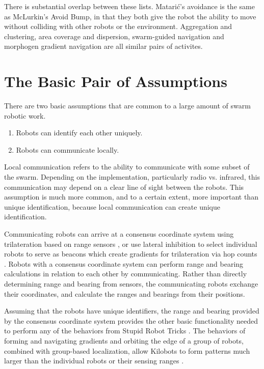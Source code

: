 \documentclass[]{article}
\begin{document}
There is substantial overlap between these lists. Matari\'c's avoidance is the same as McLurkin's Avoid Bump, in that they both give the robot the ability to move without colliding with other robots or the environment. 
Aggregation and clustering, area coverage and dispersion, swarm-guided navigation and morphogen gradient navigation are all similar pairs of activites. 


\section{The Basic Pair of Assumptions}

There are two basic assumptions that are common to a large amount of swarm robotic work. 
\begin{enumerate}
\item Robots can identify each other uniquely.
\item Robots can communicate locally. 
\end{enumerate}

Local communication refers to the ability to communicate with some subset of the swarm.
Depending on the implementation, particularly radio vs. infrared, this communication may depend on a clear line of sight between the robots. 
This assumption is much more common, and to a certain extent, more important than unique identification, because local communication can create unique identification. 

Communicating robots can arrive at a consensus coordinate system using trilateration based on range sensors \cite{cheng2005robust}, or use lateral inhibition to select individual robots to serve as beacons which create gradients for trilateration via hop counts \cite{nagpal1999organizing}.
Robots with a consensus coordinate system can perform range and bearing calculations in relation to each other by communicating.
Rather than directly determining range and bearing from sensors, the communicating robots exchange their coordinates, and calculate the ranges and bearings from their positions. 

Assuming that the robots have unique identifiers, the range and bearing provided by the consensus coordinate system provides the other basic functionality needed to perform any of the behaviors from Stupid Robot Tricks \cite{mclurkin2004stupid}.
The behaviors of forming and navigating gradients and orbiting the edge of a group of robots, combined with group-based localization, allow Kilobots to form patterns much larger than the individual robots or their sensing ranges \cite{Rubenstein795}.
\end{document}
